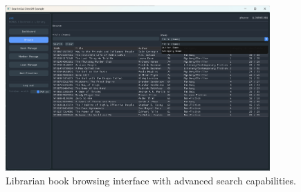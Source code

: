 \begin{figure}[H]
	\centering
	\includegraphics[width=0.9\textwidth]{figures/screenshot_librarian_browse.png}
	\caption{Librarian book browsing interface with advanced search capabilities.}
	\label{fig:ss_librarian_browse}
\end{figure}